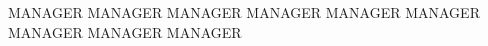 \begin{cvparagraph}
  \center
  MANAGER MANAGER MANAGER MANAGER MANAGER MANAGER MANAGER MANAGER MANAGER
\end{cvparagraph}

